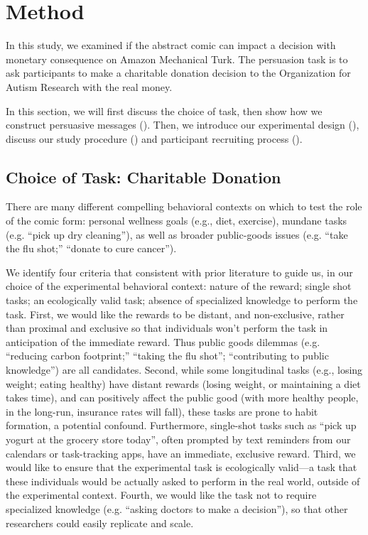 \section{Method}
\label{sec:Method}
In this study, we examined if the abstract comic can impact a decision with monetary consequence on Amazon Mechanical Turk. The persuasion task is to ask participants to make a charitable donation decision to the Organization for Autism Research with the real money. 

In this section, we will first discuss the choice of task, then show how we construct persuasive messages (). Then, we introduce our experimental design (), discuss our study procedure () and participant recruiting process ().

\subsection{Choice of Task: Charitable Donation}
\label{sub:Choice of Task: Charitable Donation}
There are many different compelling behavioral contexts on which to test the role of the comic form: personal wellness goals (e.g., diet, exercise), mundane tasks (e.g. ``pick up dry cleaning''), as well as broader public-goods issues (e.g. ``take the flu shot;'' ``donate to cure cancer'').

We identify four criteria that consistent with prior literature \cite{lee2013does, sussman2015framing,saunders2016no,rumsey2003influence} to guide us, in our choice of the experimental behavioral context: nature of the reward; single shot tasks; an ecologically valid task; absence of specialized knowledge to perform the task. First, we would like the rewards to be distant, and non-exclusive, rather than proximal and exclusive so that individuals won't perform the task in anticipation of the immediate reward. Thus public goods dilemmas (e.g. ``reducing carbon footprint;'' ``taking the flu shot''; ``contributing to public knowledge'') are all candidates. Second, while some longitudinal tasks (e.g., losing weight; eating healthy) have distant rewards (losing weight, or maintaining a diet takes time), and can positively affect the public good (with more healthy people, in the long-run, insurance rates will fall), these tasks are prone to habit formation, a potential confound. Furthermore, single-shot tasks such as ``pick up yogurt at the grocery store today'', often prompted by text reminders from our calendars or task-tracking apps, have an immediate, exclusive reward. Third, we would like to ensure that the experimental task is ecologically valid---a task that these individuals would be actually asked to perform in the real world, outside of the experimental context. Fourth, we would like the task not to require specialized knowledge (e.g. ``asking doctors to make a decision''), so that other researchers could easily replicate and scale. 


